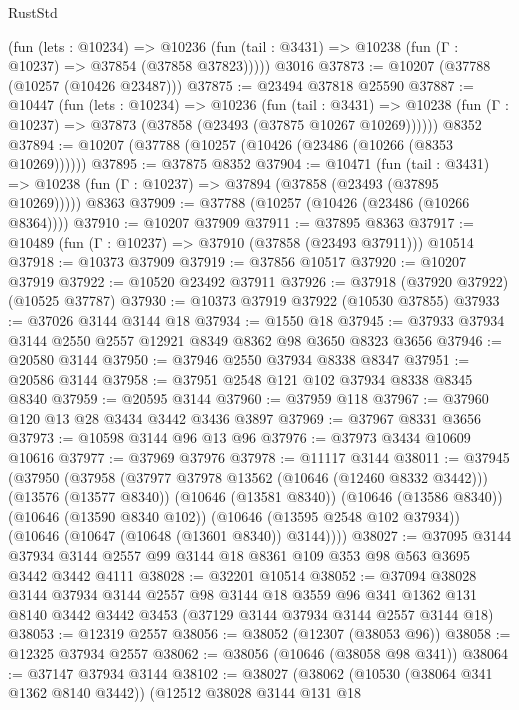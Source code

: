 \begin{lexlean}{RustStd}
\begin{coremodule}
      (fun (lets : @10234) =>
      @10236 (fun (tail : @3431) => @10238 (fun (Γ : @10237) => @37854 (@37858 @37823)))))
    @3016
@37873 := @10207 (@37788 (@10257 (@10426 @23487)))
@37875 := @23494 @37818 @25590
@37887 := @10447
    (fun (lets : @10234) =>
    @10236
      (fun (tail : @3431) =>
      @10238 (fun (Γ : @10237) => @37873 (@37858 (@23493 (@37875 @10267 @10269))))))
    @8352
@37894 := @10207 (@37788 (@10257 (@10426 (@23486 (@10266 (@8353 @10269))))))
@37895 := @37875 @8352
@37904 := @10471
    (fun (tail : @3431) => @10238 (fun (Γ : @10237) => @37894 (@37858 (@23493 (@37895 @10269)))))
    @8363
@37909 := @37788 (@10257 (@10426 (@23486 (@10266 @8364))))
@37910 := @10207 @37909
@37911 := @37895 @8363
@37917 := @10489 (fun (Γ : @10237) => @37910 (@37858 (@23493 @37911))) @10514
@37918 := @10373 @37909
@37919 := @37856 @10517
@37920 := @10207 @37919
@37922 := @10520 @23492 @37911
@37926 := @37918 (@37920 @37922) (@10525 @37787)
@37930 := @10373 @37919 @37922 (@10530 @37855)
@37933 := @37026 @3144 @3144 @18
@37934 := @1550 @18
@37945 := @37933 @37934 @3144 @2550 @2557 @12921 @8349 @8362 @98 @3650 @8323 @3656
@37946 := @20580 @3144
@37950 := @37946 @2550 @37934 @8338 @8347
@37951 := @20586 @3144
@37958 := @37951 @2548 @121 @102 @37934 @8338 @8345 @8340
@37959 := @20595 @3144
@37960 := @37959 @118
@37967 := @37960 @120 @13 @28 @3434 @3442 @3436 @3897
@37969 := @37967 @8331 @3656
@37973 := @10598 @3144 @96 @13 @96
@37976 := @37973 @3434 @10609 @10616
@37977 := @37969 @37976
@37978 := @11117 @3144
@38011 := @37945
    (@37950
      (@37958
        (@37977 @37978 @13562 (@10646 (@12460 @8332 @3442)))
        (@13576 (@13577 @8340))
        (@10646 (@13581 @8340))
        (@10646 (@13586 @8340))
        (@10646 (@13590 @8340 @102))
        (@10646 (@13595 @2548 @102 @37934))
        (@10646 (@10647 (@10648 (@13601 @8340)) @3144))))
@38027 := @37095
    @3144
    @37934
    @3144
    @2557
    @99
    @3144
    @18
    @8361
    @109
    @353
    @98
    @563
    @3695
    @3442
    @3442
    @4111
@38028 := @32201 @10514
@38052 := @37094
    @38028
    @3144
    @37934
    @3144
    @2557
    @98
    @3144
    @18
    @3559
    @96
    @341
    @1362
    @131
    @8140
    @3442
    @3442
    @3453
    (@37129 @3144 @37934 @3144 @2557 @3144 @18)
@38053 := @12319 @2557
@38056 := @38052 (@12307 (@38053 @96))
@38058 := @12325 @37934 @2557
@38062 := @38056 (@10646 (@38058 @98 @341))
@38064 := @37147 @37934 @3144
@38102 := @38027
    (@38062
      (@10530 (@38064 @341 @1362 @8140 @3442))
      (@12512
        @38028
        @3144
        @131
        @18

\end{coremodule}
\end{lexlean}
